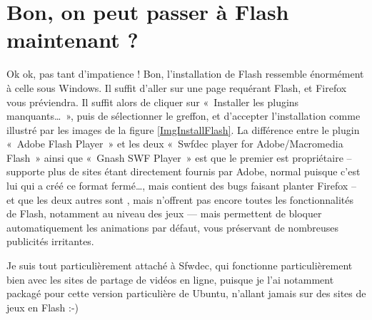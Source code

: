 \section{Bon, on peut passer à Flash maintenant ?}
Ok ok, pas tant d'impatience ! Bon, l'installation de Flash ressemble énormément à celle sous Windows. Il suffit d'aller sur une page requérant Flash, et Firefox vous préviendra. Il suffit alors de cliquer sur «~Installer les plugins manquants\ldots{}~», puis de sélectionner le greffon, et d'accepter l'installation comme illustré par les images de la figure \ref{ImgInstallFlash}. La différence entre le plugin «~Adobe Flash Player~» et les deux «~Swfdec player for Adobe/Macromedia Flash~» ainsi que «~Gnash SWF Player~» est que le premier est propriétaire -- supporte plus de sites étant directement fournis par Adobe, normal puisque c'est lui qui a créé ce format fermé\ldots{}, mais contient des bugs faisant planter Firefox -- et que les deux autres sont , mais n'offrent pas encore toutes les fonctionnalités de Flash, notamment au niveau des jeux --- mais permettent de bloquer automatiquement les animations par défaut, vous préservant de nombreuses publicités irritantes.\par
\InstallationFlash
\begin{nota}
Je suis tout particulièrement attaché à Sfwdec, qui fonctionne particulièrement bien avec les sites de partage de vidéos en ligne, puisque je l'ai notamment packagé pour cette version particulière de Ubuntu, n'allant jamais sur des sites de jeux en Flash :-)
\end{nota}
